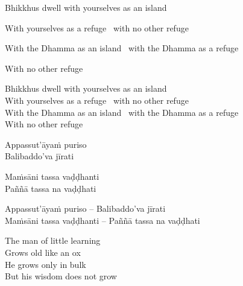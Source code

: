 \begin{english-verses}
  Bhikkhus dwell with yourselves as an island\\
\begin{english-hang-together-verses}
  With yourselves as a refuge \breathmark\ with no other refuge\\
\end{english-hang-together-verses}
\begin{english-hang-together-verses}
  With the Dhamma as an island \breathmark\ with the Dhamma as a refuge\\
\end{english-hang-together-verses}
\begin{english-hang-together-verses}
  With no other refuge
\end{english-hang-together-verses}
\end{english-verses}

\else

\begin{english-verses}
  Bhikkhus dwell with yourselves as an island\\
  With yourselves as a refuge \breathmark\ with no other refuge\\
  With the Dhamma as an island \breathmark\ with the Dhamma as a refuge\\
  With no other refuge
\end{english-verses}

\fi

\suttaRef{[SN 22.43]}

\ifninebythirteen

\begin{pali-hang-verses}
  Appassut'āyaṁ puriso\\
  Balibaddo'va jīrati
\end{pali-hang-verses}
\begin{pali-hang-together}
  Maṁsāni tassa vaḍḍhanti\\
  Paññā tassa na vaḍḍhati
\end{pali-hang-together}

\else

\begin{verses}
  Appassut'āyaṁ puriso – Balibaddo'va jīrati\\
  Maṁsāni tassa vaḍḍhanti – Paññā tassa na vaḍḍhati
\end{verses}

\fi

\begin{english-verses}
  The man of little learning\\
  Grows old like an ox\\
  He grows only in bulk\\
  But his wisdom does not grow
\end{english-verses}

